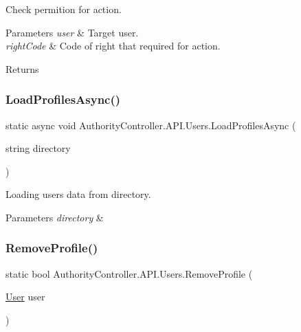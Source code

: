 Check permition for action. 


\begin{DoxyParams}{Parameters}
{\em user} & Target user.\\
\hline
{\em right\+Code} & Code of right that required for action.\\
\hline
\end{DoxyParams}
\begin{DoxyReturn}{Returns}

\end{DoxyReturn}
\mbox{\label{class_authority_controller_1_1_a_p_i_1_1_users_a5154a7787617e9c51c5519304ec89530}} 
\subsubsection{\texorpdfstring{Load\+Profiles\+Async()}{LoadProfilesAsync()}}
{\footnotesize\ttfamily static async void Authority\+Controller.\+A\+P\+I.\+Users.\+Load\+Profiles\+Async (\begin{DoxyParamCaption}\item[{string}]{directory }\end{DoxyParamCaption})\hspace{0.3cm}{\ttfamily [static]}}



Loading users data from directory. 


\begin{DoxyParams}{Parameters}
{\em directory} & \\
\hline
\end{DoxyParams}
\mbox{\label{class_authority_controller_1_1_a_p_i_1_1_users_a7239ac583f20a03adc376681494b82bb}} 
\subsubsection{\texorpdfstring{Remove\+Profile()}{RemoveProfile()}\hspace{0.1cm}{\footnotesize\ttfamily [1/2]}}
{\footnotesize\ttfamily static bool Authority\+Controller.\+A\+P\+I.\+Users.\+Remove\+Profile (\begin{DoxyParamCaption}\item[{\mbox{\hyperlink{class_authority_controller_1_1_data_1_1_user}{User}}}]{user }\end{DoxyParamCaption})\hspace{0.3cm}{\ttfamily [static]}}



